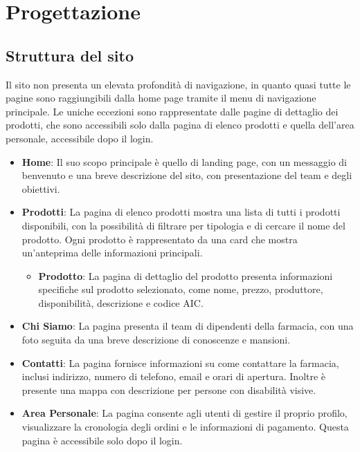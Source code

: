 \section{Progettazione}

\subsection{Struttura del sito}

Il sito non presenta un elevata profondità di navigazione, in quanto quasi tutte le pagine sono raggiungibili dalla home page tramite il menu di navigazione principale. Le uniche eccezioni sono rappresentate dalle pagine di dettaglio dei prodotti, che sono accessibili solo dalla pagina di elenco prodotti e quella dell'area personale, accessibile dopo il login.

\begin{itemize}
    \item \textbf{Home}: Il suo scopo principale è quello di landing page, con un messaggio di benvenuto e una breve descrizione del sito, con presentazione del team e degli obiettivi.
    \item \textbf{Prodotti}: La pagina di elenco prodotti mostra una lista di tutti i prodotti disponibili, con la possibilità di filtrare per tipologia e di cercare il nome del prodotto. Ogni prodotto è rappresentato da una card che mostra un'anteprima delle informazioni principali.
    \begin{itemize}
        \item \textbf{Prodotto}: La pagina di dettaglio del prodotto presenta informazioni specifiche sul prodotto selezionato, come nome, prezzo, produttore, disponibilità, descrizione e codice AIC.
    \end{itemize}
    \item \textbf{Chi Siamo}: La pagina presenta il team di dipendenti della farmacia, con una foto seguita da una breve descrizione di conoscenze e mansioni.
    \item \textbf{Contatti}: La pagina fornisce informazioni su come contattare la farmacia, inclusi indirizzo, numero di telefono, email e orari di apertura. Inoltre è presente una mappa con descrizione per persone con disabilità visive.
    \item \textbf{Area Personale}: La pagina consente agli utenti di gestire il proprio profilo, visualizzare la cronologia degli ordini e le informazioni di pagamento. Questa pagina è accessibile solo dopo il login.
    \begin{itemize}

\end{itemize}
\end{itemize}
